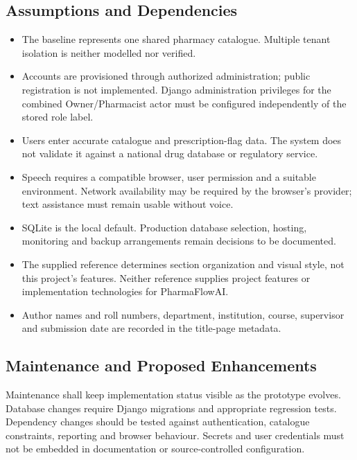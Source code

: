 \documentclass{article}
\newcommand{\Project}{PharmaFlowAI}
\begin{document}
\subsection{Assumptions and Dependencies}
\begin{itemize}
\item The baseline represents one shared pharmacy catalogue. Multiple tenant isolation is neither modelled nor verified.
\item Accounts are provisioned through authorized administration; public registration is not implemented. Django administration privileges for the combined Owner/Pharmacist actor must be configured independently of the stored role label.
\item Users enter accurate catalogue and prescription-flag data. The system does not validate it against a national drug database or regulatory service.
\item Speech requires a compatible browser, user permission and a suitable environment. Network availability may be required by the browser's provider; text assistance must remain usable without voice.
\item SQLite is the local default. Production database selection, hosting, monitoring and backup arrangements remain decisions to be documented.
\item The supplied reference determines section organization and visual style, not this project's features. Neither reference supplies project features or implementation technologies for \Project.
\item Author names and roll numbers, department, institution, course, supervisor and submission date are recorded in the title-page metadata.
\end{itemize}

\subsection{Maintenance and Proposed Enhancements}
Maintenance shall keep implementation status visible as the prototype evolves. Database changes require Django migrations and appropriate regression tests. Dependency changes should be tested against authentication, catalogue constraints, reporting and browser behaviour. Secrets and user credentials must not be embedded in documentation or source-controlled configuration.
\end{document}
